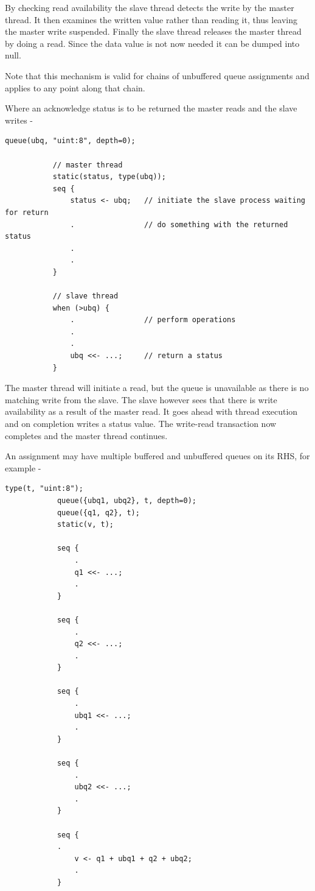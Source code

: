         By checking read availability the slave thread detects the write by the
        master thread. It then examines the written value rather than reading it,
        thus leaving the master write suspended. Finally the slave thread
        releases the master thread by doing a read. Since the data value is not
        now needed it can be dumped into null.
        
        Note that this mechanism is valid for chains of unbuffered queue
        assignments and applies to any point along that chain.
        
        Where an acknowledge status is to be returned the master reads and
        the slave writes -
        \begin{lstlisting}[gobble=8, language=threepl]
           queue(ubq, "uint:8", depth=0);

           // master thread
           static(status, type(ubq));
           seq {
               status <- ubq;   // initiate the slave process waiting for return
               .                // do something with the returned status
               .
               .
           }

           // slave thread
           when (>ubq) {
               .                // perform operations
               .
               .
               ubq <<- ...;     // return a status
           }
        \end{lstlisting}
        The master thread will initiate a read, but the queue is unavailable
        as there is no matching write from the slave. The slave however
        sees that there is write availability as a result of the master read.
        It goes ahead with thread execution and on completion writes a
        status value. The write-read transaction now completes and the master
        thread continues.

        An assignment may have multiple buffered and unbuffered queues on its
        RHS, for example -
        \begin{lstlisting}[gobble=8, language=threepl]
            type(t, "uint:8");
            queue({ubq1, ubq2}, t, depth=0);
            queue({q1, q2}, t);
            static(v, t);
           
            seq {
                .
                q1 <<- ...;
                .
            }
           
            seq {
                .
                q2 <<- ...;
                .
            }
           
            seq {
                .
                ubq1 <<- ...;
                .
            }
           
            seq {
                .
                ubq2 <<- ...;
                .
            }

            seq {
            .
                v <- q1 + ubq1 + q2 + ubq2;
                .
            }
        \end{lstlisting}
        
